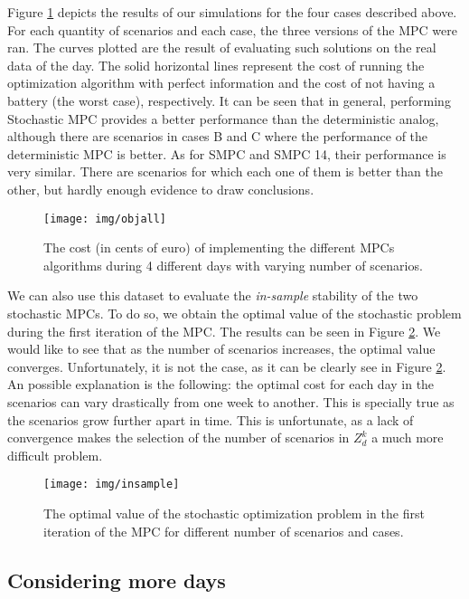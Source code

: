 \documentclass[11pt]{article}
\theoremstyle{definition}
\begin{document}
Figure \ref{fig:objall} depicts the results of our simulations for the four cases described above. 
For each quantity of scenarios and each case, the three versions of the MPC were ran. The curves plotted are the result of evaluating such solutions on the real data of the day. The solid horizontal lines represent the cost of running the optimization algorithm with perfect information and the cost of not having a battery (the worst case), respectively. 
It can be seen that in general, performing Stochastic MPC provides a better performance than the deterministic analog, although there are scenarios in cases B and C where the performance of the deterministic MPC is better.
As for SMPC and SMPC 14, their performance is very similar. There are scenarios for which each one of them is better than the other, but hardly enough evidence to draw conclusions.

\begin{figure}[htpb]
	\centering
	\texttt{[image: img/objall]}
	\caption{The cost (in cents of euro) of implementing the different MPCs algorithms during 4 different days with varying number of scenarios.}
	\label{fig:objall}
\end{figure}

We can also use this dataset to evaluate the \textit{in-sample} stability of the two stochastic MPCs. To do so, we obtain the optimal value of the stochastic problem during the first iteration of the MPC. The results can be seen in Figure \ref{fig:insample}. 
We would like to see that as the number of scenarios increases, the optimal value converges.
Unfortunately, it is not the case, as it can be clearly see in Figure \ref{fig:insample}. An possible explanation is the following: the optimal cost for each day in the scenarios can vary drastically from one week to another. This is specially true as the scenarios grow further apart in time. This is unfortunate, as a lack of convergence makes the selection of the number of scenarios in $Z^k_d$ a much more difficult problem.

\begin{figure}[htpb]
	\centering
	\texttt{[image: img/insample]}
	\caption{The optimal value of the stochastic optimization problem in the first iteration of the MPC for different number of scenarios and cases.}
	\label{fig:insample}
\end{figure}

\subsection{Considering more days}
\end{document}
